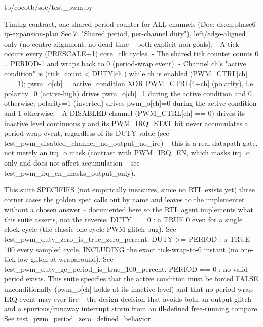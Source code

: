 \begin{relocated}{tb/cocotb/soc/test_pwm.py}
\begin{textblock}
Timing contract, one shared period counter for ALL channels (Doc: ds:ch:phase6-ip-expansion-plan
Sec.7: "Shared period, per-channel duty"), left/edge-aligned only (no centre-alignment, no
dead-time -- both explicit non-goals):
- A tick occurs every (PRESCALE+1) core_clk cycles.
- The shared tick counter counts 0 .. PERIOD-1 and wraps back to 0 (period-wrap event).
- Channel ch's "active condition" is (tick_count < DUTY[ch]) while ch is enabled
(PWM_CTRL[ch] == 1); pwm_o[ch] = active_condition XOR PWM_CTRL[4+ch] (polarity), i.e.
polarity=0 (active-high) drives pwm_o[ch]=1 during the active condition and 0 otherwise;
polarity=1 (inverted) drives pwm_o[ch]=0 during the active condition and 1 otherwise.
- A DISABLED channel (PWM_CTRL[ch] == 0) drives its inactive level continuously and its
PWM_IRQ_STAT bit never accumulates a period-wrap event, regardless of its DUTY value (see
test_pwm_disabled_channel_no_output_no_irq) -- this is a real datapath gate, not merely an
irq_o mask (contrast with PWM_IRQ_EN, which masks irq_o only and does not affect
accumulation -- see test_pwm_irq_en_masks_output_only).

This suite SPECIFIES (not empirically measures, since no RTL exists yet) three corner cases the
golden spec calls out by name and leaves to the implementer without a chosen answer -- documented
here so the RTL agent implements what this suite asserts, not the reverse:
DUTY == 0            : a TRUE 0%
even for a single clock cycle (the classic one-cycle PWM glitch bug).
See test_pwm_duty_zero_is_true_zero_percent.
DUTY >= PERIOD        : a TRUE 100%
every sampled cycle, INCLUDING the exact tick-wrap-to-0 instant (no
one-tick low glitch at wraparound). See
test_pwm_duty_ge_period_is_true_100_percent.
PERIOD == 0           : no valid period exists. This suite specifies that the active condition
must be forced FALSE unconditionally (pwm_o[ch] holds at its inactive
level) and that no period-wrap IRQ event may ever fire -- the design
decision that avoids both an output glitch and a spurious/runaway
interrupt storm from an ill-defined free-running compare. See
test_pwm_period_zero_defined_behavior.


\end{textblock}
\end{relocated}
